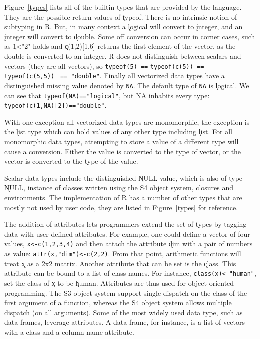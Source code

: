 \documentclass[acmsmall,10pt,review,anonymous]{acmart}\settopmatter{printfolios=true,printccs=false,printacmref=false}
\newcommand{\code}[1]{\lstinline|#1|\xspace}
\begin{document}
Figure~\ref{types} lists all of the builtin types that are provided by the
language. They are the possible return values of \k{typeof}. There is no
intrinsic notion of subtyping in R. But, in many context a \k{logical} will
convert to \k{integer}, and an \k{integer} will convert to \k{double}.  Some
off conversion can occur in corner cases, such as \k{1<"2"} holds and
\k{c(1,2)[1.6]} returns the first element of the vector, as the double is
converted to an integer. R does not distinguish between scalars and vectors
(they are all vectors), so \code{typeof(5) ==} \code{typeof(c(5)) ==
  typeof(c(5,5))} \code{ == "double"}. Finally all vectorized data types have a
distinguished missing value denoted by \code{NA}. The default type of
\code{NA} is \k{logical}. We can see that \code{typeof(NA)=="logical"}, but
NA inhabits every type: \code{typeof(c(1,NA)[2])=="double"}.

With one exception all vectorized data types are monomorphic, the exception
is the \k{list} type which can hold values of any other type including
\k{list}. For all monomorphic data types, attempting to store a value of a
different type will cause a conversion. Either the value is converted to the
type of vector, or the vector is converted to the type of the value.

Scalar data types include the distinguished \k{NULL} value, which is also of
type \k{NULL}, instance of classes written using the S4 object system,
closures and environments.  The implementation of R has a number of other
types that are mostly not used by user code, they are listed in
Figure~\ref{types} for reference.

The addition of attributes lets programmers extend the set of types by
tagging data with user-defined attributes. For example, one could define a
vector of four values, \code{x<-c(1,2,3,4)} and then attach the attribute
\k{dim} with a pair of numbers as value: \code{attr(x,"dim")<-c(2,2)}.  From
that point, arithmetic functions will treat \k{x} as a 2x2 matrix. Another
attribute that can be set is the \k{class}.  This attribute can be bound to
a list of class names. For instance, \code{class(x)<-"human"}, set the class
of \k{x} to be \k{human}.  Attributes are thus used for object-oriented
programming. The S3 object system support single dispatch on the class of
the first argument of a function, whereas the S4 object system allows
multiple dispatch (on all arguments). Some of the most widely used data
type, such as data frames, leverage attributes. A data frame, for instance,
is a list of vectors with a class and a column name attribute.
\end{document}
